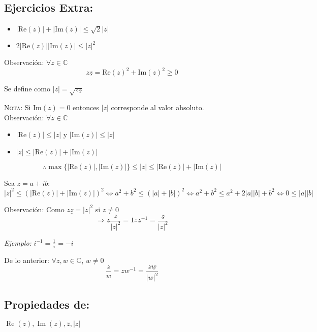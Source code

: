 \subsection*{Ejercicios Extra:}
\begin{itemize}
  \item $|\text{Re}(z)|+|\text{Im}(z)|\leq \sqrt{2}|z|$
  \item $2|\text{Re}(z)||\text{Im}(z)|\leq |z|^2$
\end{itemize}

Observación: $\forall z \in \mathbb{C}$ 
\[
  z\underline{z}=\text{Re}(z)^2+\text{Im}(z)^2 \geq 0
\]
\begin{definition}[El módulo de $z$]
  Se define como $|z|=\sqrt{z\underline{z}}$
\end{definition}

\textsc{Nota: } Si $\text{Im}(z)=0$ entonces $|z|$ corresponde al valor absoluto.\\

Observación: $\forall z \in \mathbb{C}$
\begin{itemize}
  \item $|\text{Re}(z)|\leq |z|$ y $|\text{Im}(z)|\leq |z|$
  \item $|z|\leq |\text{Re}(z)|+|\text{Im}(z)|$
\end{itemize}

\[
  \therefore \max \{ |\text{Re}(z)|, |\text{Im}(z)| \}\leq |z| \leq |\text{Re}(z)|+|\text{Im}(z)|
\]

Sea $z=a+ib$:\\
$|z|^2\leq (|\text{Re}(z)|+|\text{Im}(z)|)^2 \Leftrightarrow a^2+b^2 \leq (|a|+|b|)^2 \Leftrightarrow a^2+b^2 \leq a^2+ 2|a||b|+b^2 \Leftrightarrow 0\leq |a||b|$

Observación: Como $z\underline{z} = |z|^2$ si $z\neq 0$
\[
  \Rightarrow z\displaystyle\frac{z}{ |z|^2 }=1 \therefore z^{-1}=\displaystyle\frac{\underline{z}}{|z|^2}
\]

\textit{Ejemplo:} $i^{-1}=\frac{1}{i}=-i$

De lo anterior: $\forall z,w \in \mathbb{C}$, $w \neq 0$\\
\[
  \displaystyle\frac{z}{w}=zw^{-1}=\displaystyle\frac{z\underline{w}}{|w|^2}
\]

\subsection{Propiedades de:}
$\operatorname{Re}(z), \operatorname{Im}(z), \bar{z},|z|$

